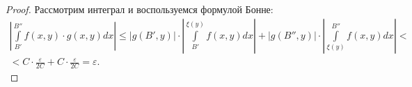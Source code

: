 \begin{proof}
	Рассмотрим интеграл и воспользуемся формулой Бонне:
	\begin{multline*}
		\left|\int\limits_{B'}^{B''}f(x,y)\cdot g(x,y)dx\right| \leqslant\left|g(B',y)\right|\cdot\left|\int\limits_{B'}^{\xi(y)}f(x,y)dx\right|+\left|g(B'',y)\right|\cdot\left|\int\limits_{\xi(y)}^{B''}f(x,y)dx\right|<\\<C\cdot\frac{\varepsilon}{2C}+C\cdot\frac{\varepsilon}{2C}=\varepsilon.
	\end{multline*} 
\end{proof}





























